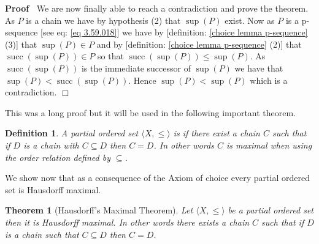\documentclass{book}
\newcommand{\tmop}[1]{\ensuremath{\operatorname{#1}}}
\newcommand{\tmtextbf}[1]{\text{{\bfseries{#1}}}}
\newenvironment{proof}{\noindent\textbf{Proof\ }}{\hspace*{\fill}$\Box$\medskip}
\newtheorem{definition}{Definition}
{\theorembodyfont{\rmfamily}\newtheorem{example}{Example}}
\newtheorem{theorem}{Theorem}
\begin{document}
\begin{proof}
  We are now finally able to reach a contradiction and prove the theorem. As
  $P$ is a chain we have by hypothesis (2) that $\sup (P)$ exist. Now as $P$
  is a p-sequence [see eq: \ref{eq 3.59.018}] we have by [definition:
  \ref{choice lemma p-sequence} (3)] that $\sup (P) \in P$ and by [definition:
  \ref{choice lemma p-sequence} (2)] that $\tmop{succ} (\sup (P)) \in P$ so
  that $\tmop{succ} (\sup (P)) \leqslant \sup (P)$. As $\tmop{succ} (\sup
  (P))$ is the immediate successor of $\sup (P)$ we have that $\sup (P) <
  \tmop{succ} (\sup (P))$. Hence $\sup (P) < \sup (P)$ which is a
  contradiction.
\end{proof}

This was a long proof but it will be used in the following important theorem.

\begin{definition}
  \label{choice Hausdorff maximal principle}{}A
  partial ordered set $\langle X, \leqslant \rangle$ is \tmtextbf{Hausdorff
  maximal} if there exist a chain $C$ such that if $D$ is a chain with $C
  \subseteq D$ then $C = D$. In other words $C$ is maximal when using the
  order relation defined by $\subseteq$.
\end{definition}

We show now that as a consequence of the Axiom of choice every partial ordered
set is Hausdorff maximal.

\begin{theorem}[Hausdorff's Maximal Theorem]
  \label{choice Hausdorff's Maximal Principle}Let $\langle X, \leqslant
  \rangle$ be a partial ordered set then it is Hausdorff maximal. In other
  words there exists a chain $C$ such that if $D$ is a chain such that $C
  \subseteq D$ then $C = D$. 
\end{theorem}
\end{document}
